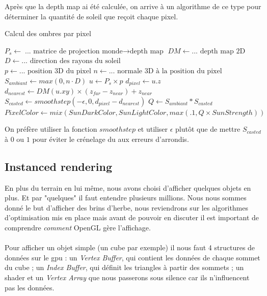 \documentclass[11pt]{article} %
\begin{document}
Après que la depth map ai été calculée, on arrive à un algorithme de ce type pour déterminer la quantité de soleil que reçoit chaque pixel.
\begin{algorithm}
\caption{Calcul des ombres par pixel}
\begin{algorithmic}
\State $P_s \gets \text{... matrice de projection monde$\rightarrow$depth map}$
\State $DM \gets \text{... depth map 2D}$
\State $D \gets \text{... direction des rayons du soleil}$
\\
\State $p \gets \text{...  position 3D du pixel}$
\State $n \gets \text{... normale 3D à la position du pixel}$
\\
\State $S_{ambiant} \gets max(0, n\cdot D)$
\State $u \gets P_s\times p$
\State $d_{pixel} \gets u.z$
\State $d_{nearest} \gets DM(u.xy)\times(z_{far}-z_{near})+z_{near}$
\State $S_{casted} \gets smoothstep(-\epsilon, 0, d_{pixel}-d_{nearest})$
\State $Q \gets S_{ambiant}*S_{casted}$
\\
\State $PixelColor\gets mix(SunDarkColor, SunLightColor, max(.1, Q\times SunStrength))$
\end{algorithmic}
\end{algorithm}

On préfère utiliser la fonction $smoothstep$ et utiliser $\epsilon$ plutôt que de mettre $S_{casted}$ à $0$ ou $1$ pour éviter le crénelage du aux erreurs d'arrondis.


\subsection{Instanced rendering}
\label{sec:instanced_rendering}

En plus du terrain en lui même, nous avons choisi d'afficher quelques objets en plus. Et par "quelques" il faut entendre plusieurs millions. Nous nous sommes donné le but d'afficher des brins d'herbe, nous reviendrons sur les algorithmes d'optimisation mis en place mais avant de pouvoir en discuter il est important de comprendre \textit{comment} OpenGL gère l'affichage.
\paragraph{}
Pour afficher un objet simple (un cube par exemple) il nous faut 4 structures de données sur le gpu : un \textit{Vertex Buffer}, qui contient les données de chaque sommet du cube ; un \textit{Index Buffer}, qui définit les triangles à partir des sommets ; un shader et un \textit{Vertex Array} que nous passerons sous silence car ils n'influencent pas les données.
\end{document}
